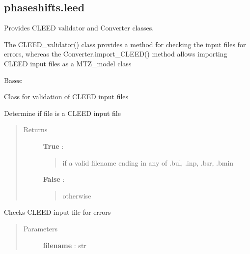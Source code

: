 \documentclass[letterpaper,10pt,english]{sphinxmanual}
\begin{document}
\subsection{phaseshifts.leed}
\label{modules:module-phaseshifts.leed}\label{modules:phaseshifts-leed}
Provides CLEED validator and Converter classes.

The CLEED\_validator() class provides a method for checking 
the input files for errors, whereas the Converter.import\_CLEED()
method allows importing CLEED input files as a MTZ\_model class

\begin{fulllineitems}
\label{modules:phaseshifts.leed.CLEED_validator}
Bases: 

Class for validation of CLEED input files

\begin{fulllineitems}
\label{modules:phaseshifts.leed.CLEED_validator.is_CLEED_file}
Determine if file is a CLEED input file
\begin{quote}\begin{description}
\item[{Returns}] \leavevmode
\textbf{True} :
\begin{quote}

if a valid filename ending in any of .bul, .inp, .bsr, .bmin
\end{quote}

\textbf{False} :
\begin{quote}

otherwise
\end{quote}

\end{description}\end{quote}

\end{fulllineitems}


\begin{fulllineitems}
\label{modules:phaseshifts.leed.CLEED_validator.validate}
Checks CLEED input file for errors
\begin{quote}\begin{description}
\item[{Parameters}] \leavevmode
\textbf{filename} : str
\begin{quote}


\end{quote}
\end{description}
\end{quote}
\end{fulllineitems}
\end{fulllineitems}
\end{document}
